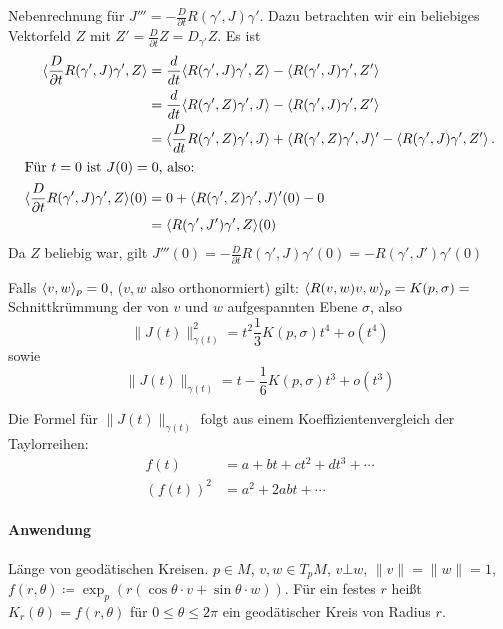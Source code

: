 \documentclass[a4paper,twoside,DIV15,BCOR12mm]{scrbook}
\renewcommand{\da}{\coloneqq}
\begin{document}
\begin{beispiel}
\begin{beweis}
\begin{enumerate}
Nebenrechnung für $J'''= -\frac D {\partial t} R(\gamma',J)\gamma'$. Dazu betrachten wir ein beliebiges Vektorfeld $Z$ mit $Z' = \frac D{\partial t}Z = D_{\gamma'}Z$. Es ist 
\begin{align*}
\langle\frac D{\partial t} R(\gamma',J) \gamma',Z\rangle &= \frac d{dt} \langle R(\gamma',J)\gamma',Z\rangle - \langle R(\gamma',J)\gamma',Z'\rangle\\
&= \frac d{dt} \langle R(\gamma',Z)\gamma',J\rangle - \langle R(\gamma',J)\gamma',Z'\rangle\\
&= \langle\frac D{dt} R(\gamma',Z)\gamma',J\rangle + \langle R(\gamma',Z)\gamma',J\rangle' - \langle R(\gamma',J)\gamma',Z'\rangle\,.\\
\intertext{Für $t=0$ ist $J(0)=0$, also:}
\langle\frac D{\partial t} R(\gamma',J) \gamma',Z\rangle(0) &= 0 + \langle R(\gamma',Z)\gamma',J\rangle'(0) - 0 \\
&= \langle R(\gamma',J')\gamma',Z\rangle(0)
\end{align*}
Da $Z$ beliebig war, gilt $J'''(0) = - \frac D{\partial t} R(\gamma',J) \gamma'(0) = - R(\gamma',J')\gamma'(0)$

\end{enumerate}
\end{beweis}

\begin{korrolar}
Falls $\langle v,w\rangle_p =0$, ($v,w$ also orthonormiert) gilt: $\langle R(v,w)v,w\rangle_p = K(p,\sigma) =$ Schnittkrümmung der von $v$ und $w$ aufgespannten Ebene $\sigma$, also
\[
\|J(t)\|_{\gamma(t)}^2 =t^2 \frac 1 3 K(p,\sigma)t^4 + o(t^4)
\]
sowie
\[
\|J(t)\|_{\gamma(t)} = t - \frac 1 6 K(p,\sigma)t^3 + o(t^3)
\]

\end{korrolar}

\begin{beweis}
Die Formel für $\|J(t)\|_{\gamma(t)}$ folgt aus einem Koeffizientenvergleich der Taylorreihen:
\begin{align*}
f(t) &= a + bt + ct^2 + dt^3+\cdots \\
(f(t))^2 &= a^2 + 2abt + \cdots
\end{align*}
\end{beweis}

\paragraph{Anwendung} Länge von geodätischen Kreisen. $p\in M$, $v,w\in T_pM$, $v\bot w$, $\|v\|=\|w\|=1$, $f(r,\theta) \da \exp_p(r (\cos \theta \cdot v + \sin \theta \cdot w))$. Für ein festes $r$ heißt $K_r(\theta) = f(r,\theta)$ für $0\le\theta\le2\pi$ ein geodätischer Kreis von Radius $r$.


\end{beispiel}
\end{document}
